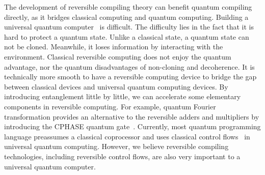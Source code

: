\documentclass{article}
\newcommand{\<}{\langle}
\renewcommand{\>}{\rangle}
\theoremstyle{definition}\newtheorem{definition}{\textit{Definition}}
\begin{document}
The development of reversible compiling theory can benefit quantum compiling~\cite{Chong2017} directly, as it bridges classical computing and quantum computing.
Building a universal quantum computer~\cite{Nielsen2002} is difficult. 
The difficulty lies in the fact that it is hard to protect a quantum state.
Unlike a classical state, a quantum state can not be cloned. Meanwhile, it loses information by interacting with the environment.
Classical reversible computing does not enjoy the quantum advantage, nor the quantum disadvantages of non-cloning and decoherence.
It is technically more smooth to have a reversible computing device to bridge the gap between classical devices and universal quantum computing devices.
By introducing entanglement little by little, we can accelerate some elementary components in reversible computing. For example, quantum Fourier transformation provides an alternative to the reversible adders and multipliers by introducing the CPHASE quantum gate~\cite{RuizPerez2017}.
Currently, most quantum programming language preassumes a classical coprocessor and uses classical control flows~\cite{Svore2018} in universal quantum computing.
However, we believe reversible compiling technologies, including reversible control flows, are also very important to a universal quantum computer.
\end{document}
